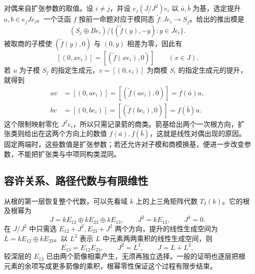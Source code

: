 \ProseParagraphBreak

对偶来自扩张参数的取值。设 \(i\ne j\)，并设 \(e_j(J/J^2)e_i\) 以 \(\bar a,\bar b\) 为基，选定提升 \(a,b\in e_jJe_i\)。一个泛函 \(f\) 按前一命题对应于模同态 \(\widetilde f:Je_i\to S_j\)。给出的推出模是
\[
	(S_j\oplus Be_i)/\{(\widetilde f(y),-y):y\in Je_i\}.
\]
被取商的子模使 \((\widetilde f(y),0)\) 与 \((0,y)\) 相差为零，因此有
\[
	[(0,xe_i)]=[(\widetilde f(xe_i),0)]\qquad(x\in J).
\]
若 \(u\) 为子模 \(S_j\) 的指定生成元，\(v=[(0,e_i)]\) 为商模 \(S_i\) 的指定生成元的提升，就得到
\[
	\begin{aligned}
		av&=[(0,ae_i)]=[(\widetilde f(ae_i),0)]=f(\bar a)u,\\
		bv&=[(0,be_i)]=[(\widetilde f(be_i),0)]=f(\bar b)u.
	\end{aligned}
\]
这个限制映射零化 \(J^2e_i\)，所以只需记录箭的商类。箭基给出两个一次根方向，扩张类则给出在这两个方向上的数值 \(f(\bar a),f(\bar b)\)，这就是线性对偶出现的原因。固定两端时，这些数值是扩张参数；若还允许对子模和商模换基，便进一步改变参数，不能把扩张类与中项同构类混同。

\subsection{容许关系、路径代数与有限维性}
\label{b5:subsec:0905:03}

从根的第一层恢复整个代数，可以先看域 \(k\) 上的上三角矩阵代数 \(T_3(k)\)。它的根及根幂为
\[
	J=kE_{12}\oplus kE_{23}\oplus kE_{13}, \qquad J^2=kE_{13},\qquad J^3=0.
\]
在 \(J/J^2\) 中只需选 \(E_{12}+J^2,E_{23}+J^2\) 两个方向，提升的线性生成空间为 \(L=kE_{12}\oplus kE_{23}\)。以 \(L^2\) 表示 \(L\) 中元素两两乘积的线性生成空间，则
\[
	E_{13}=E_{12}E_{23},\qquad J^2=L^2, \qquad J=L+L^2,
\]
较深层的 \(E_{13}\) 已由两个箭像相乘产生，无须再独立选择。一般的证明也逐层把根元素的余项写成更多箭像的乘积，根幂零性保证这个过程有限步结束。

